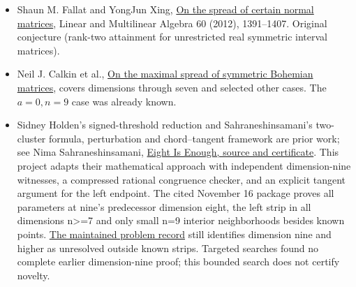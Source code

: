 \documentclass[11pt]{article}
\newcommand{\tightlist}{\setlength{\itemsep}{2pt}\setlength{\parskip}{0pt}}
\begin{document}
\begin{itemize}
\tightlist
\item
  Shaun M. Fallat and YongJun Xing, \href{https://doi.org/10.1080/03081087.2012.703189}{On the spread of certain normal matrices}, Linear and Multilinear Algebra 60 (2012), 1391--1407. Original conjecture (rank-two attainment for unrestricted real symmetric interval matrices).
\item
  Neil J. Calkin et al., \href{https://arxiv.org/abs/2510.15919}{On the maximal spread of symmetric Bohemian matrices}, covers dimensions through seven and selected other cases. The \(a=0,n=9\) case was already known.
\item
  Sidney Holden's signed-threshold reduction and Sahraneshinsamani's two-cluster formula, perturbation and chord--tangent framework are prior work; see Nima Sahraneshinsamani, \href{https://github.com/snima/sp08-dimension-eight/tree/cf035d2d7ff9db0b0a16471891fe413bd59281ef}{Eight Is Enough, source and certificate}. This project adapts their mathematical approach with independent dimension-nine witnesses, a compressed rational congruence checker, and an explicit tangent argument for the left endpoint. The cited November 16 package proves all parameters at nine's predecessor dimension eight, the left strip in all dimensions n\textgreater=7 and only small n=9 interior neighborhoods besides known points. \href{https://github.com/ajt60gaibb/OpenProblemsInNLA/blob/main/eigenvalues-and-inverse-problems/SP-08/README.md}{The maintained problem record} still identifies dimension nine and higher as unresolved outside known strips. Targeted searches found no complete earlier dimension-nine proof; this bounded search does not certify novelty.
\end{itemize}
\end{document}
